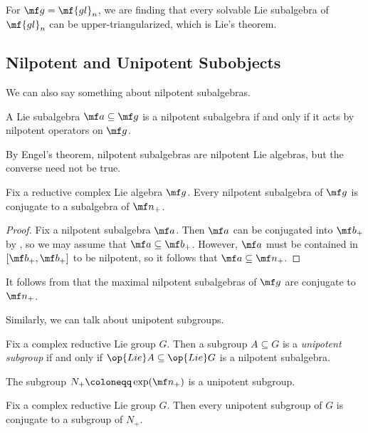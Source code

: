 \documentclass[../notes.tex]{subfiles}
\begin{document}
\begin{example}
	For $\mf g=\mf{gl}_n$, we are finding that every solvable Lie subalgebra of $\mf{gl}_n$ can be upper-triangularized, which is Lie's theorem.
\end{example}

\subsection{Nilpotent and Unipotent Subobjects}
We can also say something about nilpotent subalgebras.
\begin{definition}
	A Lie subalgebra $\mf a\subseteq\mf g$ is a nilpotent subalgebra if and only if it acts by nilpotent operators on $\mf g$.
\end{definition}
\begin{remark}
	By Engel's theorem, nilpotent subalgebras are nilpotent Lie algebras, but the converse need not be true.
\end{remark}
\begin{corollary} \label{cor:nilp-subalg}
	Fix a reductive complex Lie algebra $\mf g$. Every nilpotent subalgebra of $\mf g$ is conjugate to a subalgebra of $\mf n_+$.
\end{corollary}
\begin{proof}
	Fix a nilpotent subalgebra $\mf a$. Then $\mf a$ can be conjugated into $\mf b_+$ by , so we may assume that $\mf a\subseteq\mf b_+$. However, $\mf a$ must be contained in $[\mf b_+,\mf b_+]$ to be nilpotent, so it follows that $\mf a\subseteq\mf n_+$.
\end{proof}
\begin{remark}
	It follows from  that the maximal nilpotent subalgebras of $\mf g$ are conjugate to $\mf n_+$.
\end{remark}
Similarly, we can talk about unipotent subgroups.
\begin{definition}[unipotent]
	Fix a complex reductive Lie group $G$. Then a subgroup $A\subseteq G$ is a \textit{unipotent subgroup} if and only if $\op{Lie}A\subseteq\op{Lie}G$ is a nilpotent subalgebra. 
\end{definition}
\begin{example}
	The subgroup $N_+\coloneqq\exp(\mf n_+)$ is a unipotent subgroup.
\end{example}
\begin{corollary}
	Fix a complex reductive Lie group $G$. Then every unipotent subgroup of $G$ is conjugate to a subgroup of $N_+$.
\end{corollary}
\end{document}
